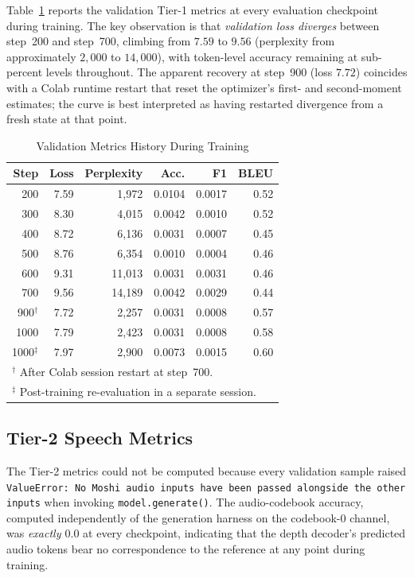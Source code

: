 \documentclass[conference]{IEEEtran}
\begin{document}
Table~\ref{tab:metrics} reports the validation Tier-1 metrics at every evaluation checkpoint during training. The key observation is that \emph{validation loss diverges} between step~200 and step~700, climbing from $7.59$ to $9.56$ (perplexity from approximately $2{,}000$ to $14{,}000$), with token-level accuracy remaining at sub-percent levels throughout. The apparent recovery at step~900 (loss $7.72$) coincides with a Colab runtime restart that reset the optimizer's first- and second-moment estimates; the curve is best interpreted as having restarted divergence from a fresh state at that point.

\begin{table}[t]
\caption{Validation Metrics History During Training}
\label{tab:metrics}
\centering
\setlength{\tabcolsep}{4pt}
\begin{tabular}{rrrrrr}
\toprule
\textbf{Step} & \textbf{Loss} & \textbf{Perplexity} & \textbf{Acc.} & \textbf{F1} & \textbf{BLEU} \\
\midrule
200  & 7.59 & 1{,}972  & 0.0104 & 0.0017 & 0.52 \\
300  & 8.30 & 4{,}015  & 0.0042 & 0.0010 & 0.52 \\
400  & 8.72 & 6{,}136  & 0.0031 & 0.0007 & 0.45 \\
500  & 8.76 & 6{,}354  & 0.0010 & 0.0004 & 0.46 \\
600  & 9.31 & 11{,}013 & 0.0031 & 0.0031 & 0.46 \\
700  & 9.56 & 14{,}189 & 0.0042 & 0.0029 & 0.44 \\
900$^\dagger$  & 7.72 & 2{,}257 & 0.0031 & 0.0008 & 0.57 \\
1000 & 7.79 & 2{,}423  & 0.0031 & 0.0008 & 0.58 \\
1000$^\ddagger$ & 7.97 & 2{,}900 & 0.0073 & 0.0015 & 0.60 \\
\bottomrule
\multicolumn{6}{l}{\footnotesize $^\dagger$ After Colab session restart at step~700.} \\
\multicolumn{6}{l}{\footnotesize $^\ddagger$ Post-training re-evaluation in a separate session.}
\end{tabular}
\end{table}

\subsection{Tier-2 Speech Metrics}

The Tier-2 metrics could not be computed because every validation sample raised \texttt{ValueError: No Moshi audio inputs have been passed alongside the other inputs} when invoking \texttt{model.generate()}. The audio-codebook accuracy, computed independently of the generation harness on the codebook-0 channel, was \emph{exactly $0.0$} at every checkpoint, indicating that the depth decoder's predicted audio tokens bear no correspondence to the reference at any point during training.
\end{document}
